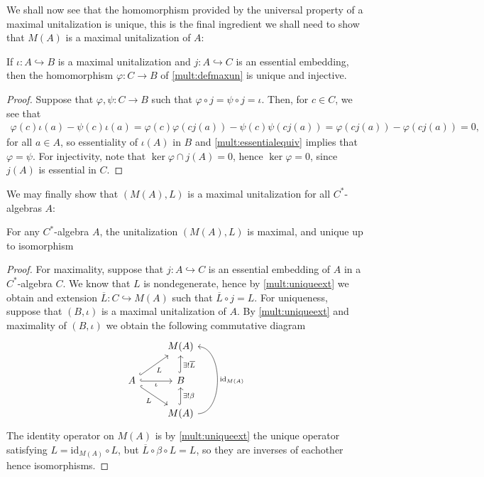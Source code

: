 We shall now see that the homomorphism provided by the universal property of a maximal unitalization is unique, this is the final ingredient we shall need to show that $M(A)$ is a maximal unitalization of $A$:
\begin{lemma}
	If $\iota \colon A \hookrightarrow B$ is a maximal unitalization and $j \colon A \hookrightarrow C$ is an essential embedding, then the homomorphism $\varphi \colon C \to B$ of \ref{mult:defmaxun} is unique and injective.
	\label{mult:uniquemax}
\end{lemma}
\begin{proof}
	Suppose that $\varphi, \psi \colon C \to B$ such that $\varphi \circ j = \psi \circ j = \iota$. Then, for $c \in C$, we see that
	\begin{align*}
		\varphi(c) \iota(a) - \psi(c) \iota(a) = \varphi(c) \varphi(c j(a)) - \psi(c) \psi(c j(a)) =  \varphi(cj(a))-\varphi(cj(a))=0,
	\end{align*}
	for all $a \in A$, so essentiality of $\iota(A)$ in $B$ and \ref{mult:essentialequiv} implies that $\varphi = \psi$. For injectivity, note that $\ker \varphi \cap j(A) = 0$, hence $\ker \varphi = 0$, since $j(A)$ is essential in $C$.
\end{proof}
We may finally show that $(M(A),L)$ is a maximal unitalization for all $C^*$-algebras $A$:
\begin{theorem}
	For any $C^*$-algebra $A$, the unitalization $(M(A),L)$ is maximal, and unique up to isomorphism
	\label{mult:multmax}
\end{theorem}
\begin{proof}
	For maximality, suppose that $j \colon A \hookrightarrow C$ is an essential embedding of $A$ in a $C^*$-algebra $C$. We know that $L$ is nondegenerate, hence by \ref{mult:uniqueext} we obtain and extension $\overline{L} \colon C \hookrightarrow M(A)$ such that $\overline{L} \circ j = L$.
	For uniqueness, suppose that $(B,\iota)$ is a maximal unitalization of $A$. By \ref{mult:uniqueext} and maximality of $(B,\iota)$ we obtain the following commutative diagram
	\begin{equation}
		\begin{tikzcd}
	 		& M(A)\\
			A\arrow[rd, " L" ',hook] \arrow[r, "\iota"', hook] \arrow[ru, "L"', hook] & B \ar[u , "\exists !\overline L"', hook ]\\
			& M(A) \arrow[u, "\exists ! \beta"', hook] \ar[uu, "\mathrm{id}_{M(A)}"', bend right  = 90]
		\end{tikzcd}
	\end{equation}
	The identity operator on $M(A)$ is by \ref{mult:uniqueext} the unique operator satisfying $L = \mathrm{id}_{M(A)} \circ L$, but $\overline L \circ \beta \circ L = L$, so they are inverses of eachother hence isomorphisms.
\end{proof}

